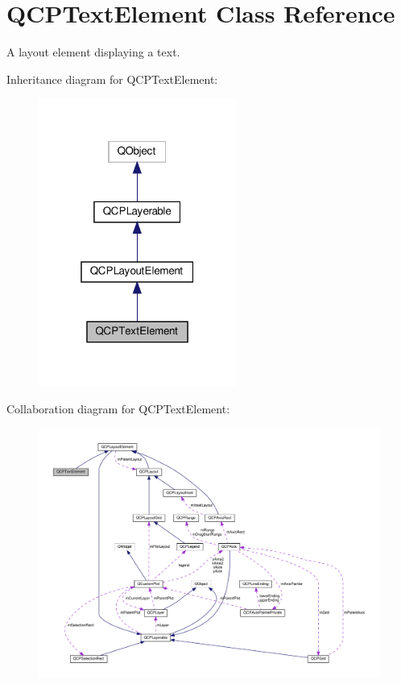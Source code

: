 \hypertarget{classQCPTextElement}{}\section{Q\+C\+P\+Text\+Element Class Reference}
\label{classQCPTextElement}


A layout element displaying a text.  




Inheritance diagram for Q\+C\+P\+Text\+Element\+:\nopagebreak
\begin{figure}[H]
\begin{center}
\leavevmode
\includegraphics[width=184pt]{classQCPTextElement__inherit__graph}
\end{center}
\end{figure}


Collaboration diagram for Q\+C\+P\+Text\+Element\+:\nopagebreak
\begin{figure}[H]
\begin{center}
\leavevmode
\includegraphics[width=350pt]{classQCPTextElement__coll__graph}
\end{center}
\end{figure}
